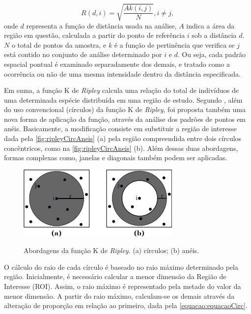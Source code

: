 \begin{equation}
\label{equacao:equacaoRipley}
R(d,i) = \sqrt{\frac{Ak(i,j)}{N}}, i \neq j,
\end{equation}onde $d$ representa a função de distância usada na análise, $A$ indica a área da região em questão, calculada a partir do ponto de referência $i$ sob a distância $d$. $N$ o total de pontos da amostra, e $k$ é a função de pertinência que verifica se $j$ está contido no conjunto de análise determinado por $i$ e $d$. Ou seja, cada padrão espacial pontual é examinado separadamente dos demais, e tratado como a ocorrência ou não de uma mesma intensidade dentro da distância especificada.

Em suma, a função K de \textit{Ripley} calcula uma relação do total de indivíduos de uma determinada espécie distribuída em uma região de estudo. Segundo \cite{martins2007detecccao}, além do uso convencional (círculos) da função K de \textit{Ripley}, foi proposta também uma nova forma de aplicação da função, através da análise dos padrões de pontos em anéis. Basicamente, a modificação consiste em substituir a região de interesse dada pela \autoref{fig:ripleyCircAneis} (a) pela região compreendida entre dois círculos concêntricos, como na \autoref{fig:ripleyCircAneis} (b). Além dessas duas abordagens, formas complexas como, janelas e diagonais também podem ser aplicadas.

\begin{figure}[ht]
    \centering
    \caption{Abordagens da função K de \textit{Ripley}. (a) círculos; (b) anéis.}
     \includegraphics[width=8cm]{figs/RipleyCircAneis1.png}
    \label{fig:ripleyCircAneis}
\end{figure}

O cálculo do raio de cada círculo é baseado no raio máximo determinado pela região. Inicialmente, é necessário calcular a menor dimensão da Região de Interesse (ROI). Assim, o raio máximo é representado pela metade do valor da menor dimensão. A partir do raio máximo, calculam-se os demais através da alteração de proporção em relação ao primeiro, dada pela \autoref{equacao:equacaoCirc}.

